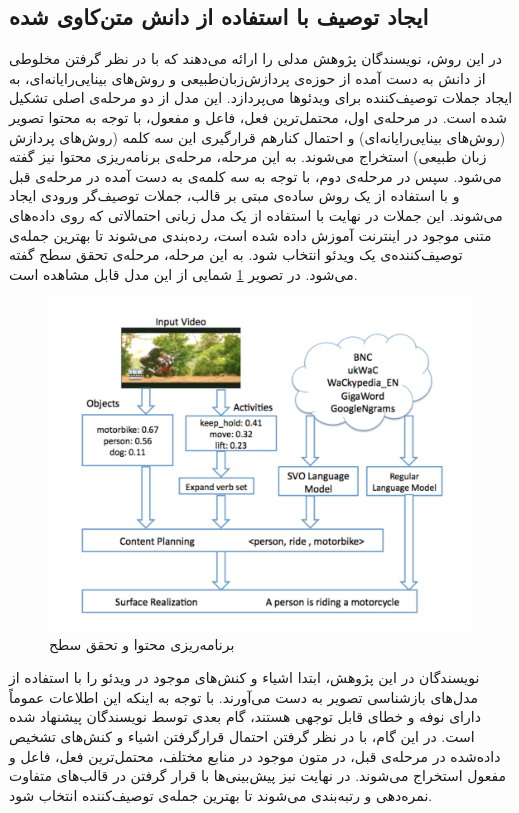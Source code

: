 \subsection{ایجاد توصیف با استفاده از دانش متن‌کاوی شده}\label{text-mined-knowledge}
در این روش، نویسندگان پژوهش
\cite{Krishnamoorthy2013} 
 مدلی را ارائه می‌دهند که با در نظر گرفتن مخلوطی از دانش به دست آمده از حوزه‌ی پردازش‌زبان‌طبیعی و روش‌های بینایی‌رایانه‌ای، به ایجاد جملات توصیف‌کننده برای ویدئو‌ها می‌پردازد. این مدل از دو مرحله‌ی اصلی تشکیل شده است. در مرحله‌ی اول، محتمل‌ترین فعل، فاعل و مفعول، با توجه به محتوا تصویر (روش‌‌های بینایی‌رایانه‌ای) و احتمال کنار‌هم قرارگیری این سه کلمه (روش‌های پردازش‌ زبان‌ طبیعی) استخراج می‌شوند. به این مرحله، مرحله‌ی برنامه‌ریزی محتوا 
  نیز گفته می‌شود. سپس در مرحله‌ی دوم، با توجه به سه‌ کلمه‌ی به دست آمده در مرحله‌ی قبل و با استفاده از یک روش ساده‌ی مبتی بر قالب، جملات توصیف‌گر ورودی ایجاد می‌شوند. این جملات در نهایت با استفاده از یک مدل زبانی‌ احتمالاتی که روی داده‌های متنی موجود در اینترنت آموزش داده‌ شده است، رده‌بندی می‌شوند تا بهترین جمله‌ی توصیف‌کننده‌ی یک ویدئو انتخاب شود. به این مرحله‌، مرحله‌ی تحقق سطح 
   گفته‌ می‌شود. در تصویر 
\ref{text-mined-knowledge-model-1} 
   شمایی از این مدل قابل مشاهده‌ است.
\begin{figure}[h]
	\centering
	\includegraphics[width=120mm]{images/Text-mined-knowledge-model.png}
	\caption{برنامه‌ریزی محتوا و تحقق سطح \label{text-mined-knowledge-model-1}\cite{Krishnamoorthy2013}}
\end{figure}
نویسندگان در این پژوهش، ابتدا اشیاء و کنش‌های موجود در ویدئو را با استفاده از مدل‌های بازشناسی تصویر به دست می‌آورند. با توجه به اینکه این اطلاعات عموماً دارای نوفه
 و خطای قابل توجهی هستند، گام بعدی توسط نویسندگان پیشنهاد شده است. در این گام، با در نظر گرفتن احتمال قرار‌گرفتن اشیاء و کنش‌های تشخیص داده‌شده در مرحله‌ی قبل، در متون موجود در منابع مختلف، محتمل‌ترین فعل،‌ فاعل و مفعول استخراج می‌شوند. در نهایت نیز پیش‌بینی‌ها با قرار گرفتن در قالب‌های متفاوت نمره‌دهی و رتبه‌بندی می‌شوند تا بهترین جمله‌ی توصیف‌کننده انتخاب شود.

